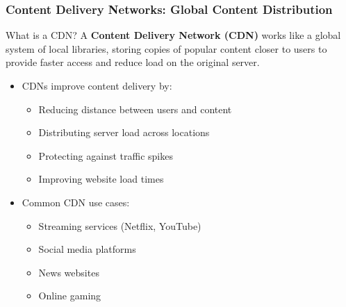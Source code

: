 \documentclass{beamer}
\begin{document}
\begin{frame}
    \frametitle{Content Delivery Networks: Global Content Distribution}
    
    \begin{alertblock}{What is a CDN?}
        A \textbf{Content Delivery Network (CDN)} works like a global system of local libraries, storing copies of popular content closer to users to provide faster access and reduce load on the original server.
    \end{alertblock}
    
    \begin{itemize}
        \item CDNs improve content delivery by:
        \begin{itemize}
            \item Reducing distance between users and content
            \item Distributing server load across locations
            \item Protecting against traffic spikes
            \item Improving website load times
        \end{itemize}
        
        \item Common CDN use cases:
        \begin{itemize}
            \item Streaming services (Netflix, YouTube)
            \item Social media platforms
            \item News websites
            \item Online gaming
        \end{itemize}
    \end{itemize}
\end{frame}
\end{document}
